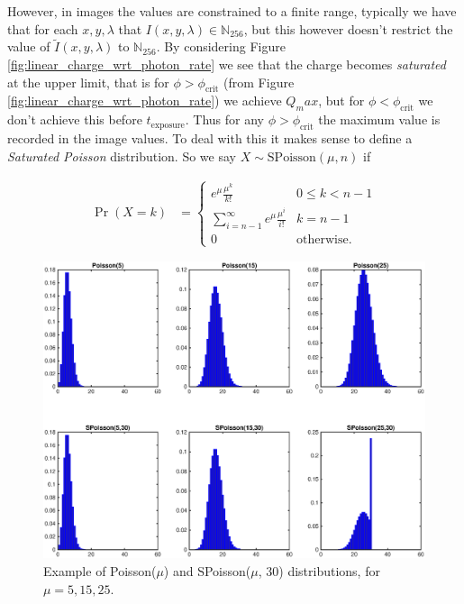 \documentclass[12pt,twoside,notitlepage]{report}
\newcommand{\bb}[1]{\mathbb{#1}}
\begin{document}
            However, in images the values are constrained to a finite range, typically we have that for each $x, y, 
            \lambda$ that $I(x,y,\lambda) \in \bb{N}_{256}$, but this however doesn't restrict the value of
            $\tilde{I}(x,y,\lambda)$ to $\bb{N}_{256}$. By considering Figure \ref{fig:linear_charge_wrt_photon_rate} 
            we see that the charge becomes \textit{saturated} at the upper limit, that is for $\phi > \phi_{\text{crit}}$
            (from Figure \ref{fig:linear_charge_wrt_photon_rate}) we achieve $Q_max$, but for $\phi < \phi_{\text{crit}}$ 
            we don't achieve this before $t_{\text{exposure}}$. Thus for any $\phi > \phi_{\text{crit}}$ the maximum 
            value is recorded in the image values. To deal with this it makes sense to define a 
            \textit{Saturated Poisson} distribution. So we say $X \sim \text{SPoisson}(\mu, n)$ if 

            \begin{align}
                \Pr(X = k) & = 
                    \begin{cases}
                        e^{\mu} \frac{\mu^k}{k!} & 0 \leq k < n-1 \\
                        \sum\limits_{i=n-1}^\infty e^{\mu} \frac{\mu^i}{i!} & k = n-1 \\
                        0 & \text{otherwise}.
                    \end{cases} 
            \end{align}

            \begin{figure}[H]
                \centering 
                \includegraphics[scale=0.5]{poisson_distributions}
                \caption{Example of Poisson($\mu$) and SPoisson($\mu$, 30) distributions, for $\mu = 5,15,25$.}
            \end{figure}
\end{document}
